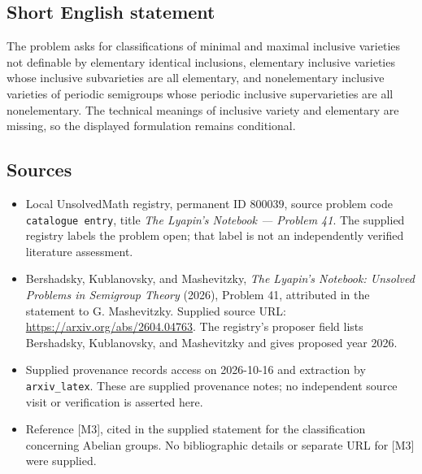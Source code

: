 \documentclass[11pt]{article}
\begin{document}
\subsection{Short English statement}
The problem asks for classifications of minimal and maximal inclusive varieties not definable by elementary identical inclusions, elementary inclusive varieties whose inclusive subvarieties are all elementary, and nonelementary inclusive varieties of periodic semigroups whose periodic inclusive supervarieties are all nonelementary. The technical meanings of inclusive variety and elementary are missing, so the displayed formulation remains conditional.
\subsection{Sources}
\begin{itemize}
\item Local UnsolvedMath registry, permanent ID \(800039\), source problem code \texttt{catalogue entry}, title \emph{The Lyapin's Notebook --- Problem 41}. The supplied registry labels the problem open; that label is not an independently verified literature assessment.
\item Bershadsky, Kublanovsky, and Mashevitzky, \emph{The Lyapin's Notebook: Unsolved Problems in Semigroup Theory} (2026), Problem 41, attributed in the statement to G. Mashevitzky. Supplied source URL: \url{https://arxiv.org/abs/2604.04763}. The registry's proposer field lists Bershadsky, Kublanovsky, and Mashevitzky and gives proposed year 2026.
\item Supplied provenance records access on 2026-10-16 and extraction by \texttt{arxiv\_latex}. These are supplied provenance notes; no independent source visit or verification is asserted here.
\item Reference [M3], cited in the supplied statement for the classification concerning Abelian groups. No bibliographic details or separate URL for [M3] were supplied.
\end{itemize}
\end{document}
